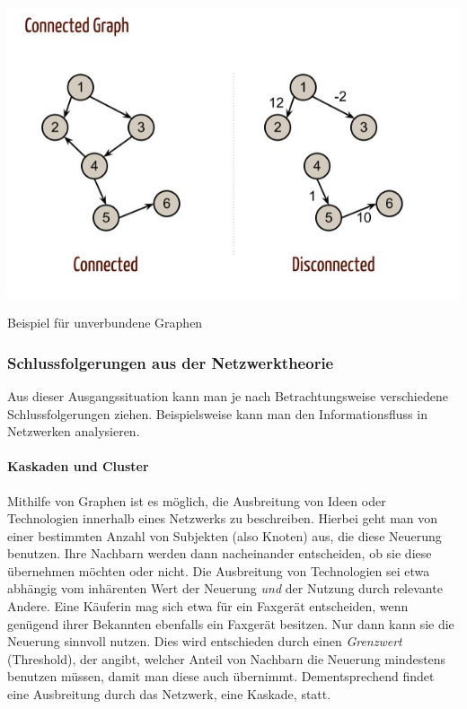 \begin{dsafigure}
	\begin{center}
	\includegraphics[width=0.9\columnwidth]{img/Graph-Connected.jpg}
	\caption{Beispiel für unverbundene Graphen \parencite[vgl.][]{Kleinberg-2009-oz}}
	\label{fig:graph-connected}
	\end{center}
\end{dsafigure}


\subsubsection{Schlussfolgerungen aus der Netzwerktheorie}

Aus dieser Ausgangssituation kann man je nach Betrachtungsweise verschiedene Schlussfolgerungen ziehen.
Beispielsweise kann man den Informationsfluss in Netzwerken analysieren.


\paragraph{Kaskaden und Cluster}

Mithilfe von Graphen ist es möglich, die Ausbreitung von Ideen oder Technologien innerhalb eines Netzwerks zu beschreiben.
Hierbei geht man von einer bestimmten Anzahl von Subjekten (also Knoten) aus, die diese Neuerung benutzen.
Ihre Nachbarn werden dann nacheinander entscheiden, ob sie diese übernehmen möchten oder nicht.
Die Ausbreitung von Technologien sei etwa abhängig vom inhärenten Wert der Neuerung \emph{und} der Nutzung durch relevante Andere.
Eine Käuferin mag sich etwa für ein Faxgerät entscheiden, wenn genügend ihrer Bekannten ebenfalls ein Faxgerät besitzen.
Nur dann kann sie die Neuerung sinnvoll nutzen.
Dies wird entschieden durch einen \emph{Grenzwert} (Threshold), der angibt, welcher Anteil von Nachbarn die Neuerung mindestens benutzen müssen, damit man diese auch übernimmt.
Dementsprechend findet eine Ausbreitung durch das Netzwerk, eine Kaskade, statt.

